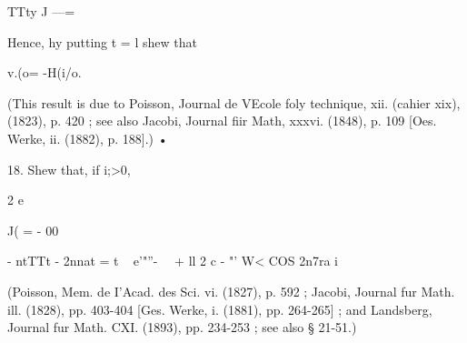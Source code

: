  TTty J ---= 

Hence, hy putting t = l shew that 

v.(o= -H(i/o. 

(This result is due to Poisson, Journal de VEcole foly technique, xii. (cahier xix), (1823), 
p. 420 ; see also Jacobi, Journal fiir Math, xxxvi. (1848), p. 109 [Oes. Werke, ii. (1882), 
p. 188].) • 

18. Shew that, if i;>0, 



2 e 

J( = - 00 



- ntTTt - 2nnat = t ~   e'"''-  \ \  + ll 2 c - "' W< COS 2n7ra i 



(Poisson, Mem. de I'Acad. des Sci. vi. (1827), p. 592 ; Jacobi, Journal fur Math. ill. 
(1828), pp. 403-404 [Ges. Werke, i. (1881), pp. 264-265] ; and Landsberg, Journal fur 
Math. CXI. (1893), pp. 234-253 ; see also § 21-51.) 

